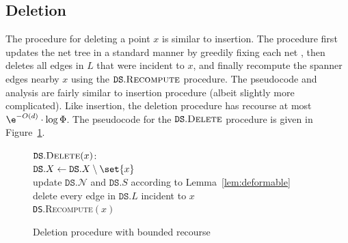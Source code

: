 \documentclass[11pt]{article}
\newcommand{\cN}{\mathcal{N}}
\newcommand{\ddim}{\ensuremath{d}}
\newcommand{\DS}{\texttt{DS}}
\newcommand{\points}{{\ensuremath{\DS.X}}}
\newcommand{\sparse}{{\ensuremath{\DS.S}}}
\newcommand{\net}{{\ensuremath{\DS.\cN}}}
\newcommand{\light}{{\ensuremath{\DS.L}}}
\begin{document}
\subsection{Deletion}
The procedure for deleting a point $x$ is similar to insertion. The procedure \EMPH{$\DS.\textsc{Delete}(x)$} first updates the net tree in a standard manner by greedily fixing each net \cite{gao2004deformable,KL04}, then deletes all edges in $L$ that were incident to $x$, and finally recompute the spanner edges nearby $x$ using the $\DS.\textsc{Recompute}$ procedure. The pseudocode and analysis are fairly similar to insertion procedure (albeit slightly more complicated).
Like insertion, the deletion procedure has recourse at most $\e^{-O(\ddim)} \cdot \log \Phi$. 
% 
The pseudocode for the $\DS.\textsc{Delete}$ procedure is given in Figure~\ref{fig:delete-recourse}.

\begin{figure}[h!]
\centering
\begin{algorithm}
    \ul{$\DS.\textsc{Delete}(x)$}:\+
    \\ $\points \gets \points \setminus \set{x}$
    \\ update $\net$ and $\sparse$ according to Lemma~\ref{lem:deformable}
    \\ delete every edge in $\light$ incident to $x$
    \\ \DS.\textsc{Recompute}$(x)$
\end{algorithm}
\caption{Deletion procedure with bounded recourse}
\label{fig:delete-recourse}
\end{figure}
\end{document}
